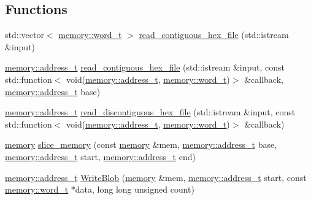 \subsection*{Functions}
\begin{DoxyCompactItemize}
\item 
std\+::vector$<$ \hyperlink{classllk_1_1memory_a432a6c0ae1bcb9c44d79cfa1a239419c}{memory\+::word\+\_\+t} $>$ \hyperlink{namespacellk_abab62bc3369d43352be7b3f6b24a2717}{read\+\_\+contiguous\+\_\+hex\+\_\+file} (std\+::istream \&input)
\item 
\hyperlink{classllk_1_1memory_ae7a4b897aa999f22e250dc8e4d773dec}{memory\+::address\+\_\+t} \hyperlink{namespacellk_a990d22b32661648e11a518ee5ce97f59}{read\+\_\+contiguous\+\_\+hex\+\_\+file} (std\+::istream \&input, const std\+::function$<$ void(\hyperlink{classllk_1_1memory_ae7a4b897aa999f22e250dc8e4d773dec}{memory\+::address\+\_\+t}, \hyperlink{classllk_1_1memory_a432a6c0ae1bcb9c44d79cfa1a239419c}{memory\+::word\+\_\+t})$>$ \&callback, \hyperlink{classllk_1_1memory_ae7a4b897aa999f22e250dc8e4d773dec}{memory\+::address\+\_\+t} base)
\item 
\hyperlink{classllk_1_1memory_ae7a4b897aa999f22e250dc8e4d773dec}{memory\+::address\+\_\+t} \hyperlink{namespacellk_a8727be2796e20502d8401b0bd7090a31}{read\+\_\+discontiguous\+\_\+hex\+\_\+file} (std\+::istream \&input, const std\+::function$<$ void(\hyperlink{classllk_1_1memory_ae7a4b897aa999f22e250dc8e4d773dec}{memory\+::address\+\_\+t}, \hyperlink{classllk_1_1memory_a432a6c0ae1bcb9c44d79cfa1a239419c}{memory\+::word\+\_\+t})$>$ \&callback)
\item 
\hyperlink{classllk_1_1memory}{memory} \hyperlink{namespacellk_adb43fe0eeac466803ff0566f52b4f7a8}{slice\+\_\+memory} (const \hyperlink{classllk_1_1memory}{memory} \&mem, \hyperlink{classllk_1_1memory_ae7a4b897aa999f22e250dc8e4d773dec}{memory\+::address\+\_\+t} base, \hyperlink{classllk_1_1memory_ae7a4b897aa999f22e250dc8e4d773dec}{memory\+::address\+\_\+t} start, \hyperlink{classllk_1_1memory_ae7a4b897aa999f22e250dc8e4d773dec}{memory\+::address\+\_\+t} end)
\item 
\hyperlink{classllk_1_1memory_ae7a4b897aa999f22e250dc8e4d773dec}{memory\+::address\+\_\+t} \hyperlink{namespacellk_af632f3a3bce5453659e5ba431edd703b}{Write\+Blob} (\hyperlink{classllk_1_1memory}{memory} \&mem, \hyperlink{classllk_1_1memory_ae7a4b897aa999f22e250dc8e4d773dec}{memory\+::address\+\_\+t} start, const \hyperlink{classllk_1_1memory_a432a6c0ae1bcb9c44d79cfa1a239419c}{memory\+::word\+\_\+t} $\ast$data, long long unsigned count)

\end{DoxyCompactItemize}
